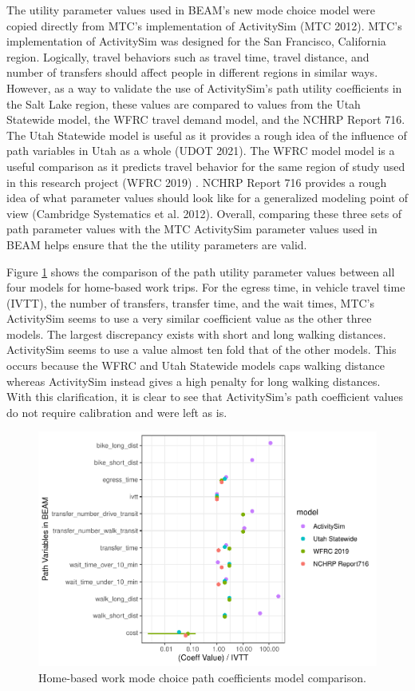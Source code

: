 \documentclass[12pt, oneside, openright]{byuthesis}
\begin{document}
The utility parameter values used in BEAM's new mode choice model were copied directly from MTC's implementation of ActivitySim (MTC 2012). MTC's implementation of ActivitySim was designed for the San Francisco, California region. Logically, travel behaviors such as travel time, travel distance, and number of transfers should affect people in different regions in similar ways. However, as a way to validate the use of ActivitySim's path utility coefficients in the Salt Lake region, these values are compared to values from the Utah Statewide model, the WFRC travel demand model, and the NCHRP Report 716. The Utah Statewide model is useful as it provides a rough idea of the influence of path variables in Utah as a whole (UDOT 2021). The WFRC model model is a useful comparison as it predicts travel behavior for the same region of study used in this research project (WFRC 2019) . NCHRP Report 716 provides a rough idea of what parameter values should look like for a generalized modeling point of view (Cambridge Systematics et al. 2012). Overall, comparing these three sets of path parameter values with the MTC ActivitySim parameter values used in BEAM helps ensure that the the utility parameters are valid.

Figure \ref{fig:hbw} shows the comparison of the path utility parameter values between all four models for home-based work trips. For the egress time, in vehicle travel time (IVTT), the number of transfers, transfer time, and the wait times, MTC's ActivitySim seems to use a very similar coefficient value as the other three models. The largest discrepancy exists with short and long walking distances. ActivitySim seems to use a value almost ten fold that of the other models. This occurs because the WFRC and Utah Statewide models caps walking distance whereas ActivitySim instead gives a high penalty for long walking distances. With this clarification, it is clear to see that ActivitySim's path coefficient values do not require calibration and were left as is.

\begin{figure}

{\centering \includegraphics{thesis_files/figure-latex/hbw-1} 

}

\caption{Home-based work mode choice path coefficients model comparison.}\label{fig:hbw}
\end{figure}
\end{document}

